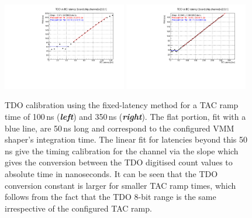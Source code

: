 \begin{figure}[!htb]
    \begin{center}
        \includegraphics[width=0.48\textwidth]{figures/nsw/calibration/timing_calib_bcLatency_TAC100}
        \includegraphics[width=0.48\textwidth]{figures/nsw/calibration/timing_calib_bcLatency_TAC350}
        \caption{
            TDO calibration using the fixed-latency method for a TAC ramp time of 100\,ns (\textbf{\textit{left}})
            and 350\,ns (\textbf{\textit{right}}).
            The flat portion, fit with a blue line, are 50\,ns long and correspond to the configured
            VMM shaper's integration time.
            The linear fit for latencies beyond this 50\,ns give the timing calibration for the channel via
            the slope which gives the conversion between the TDO digitised count values to absolute
            time in nanoseconds.
            It can be seen that the TDO conversion constant is larger for smaller TAC ramp times,
            which follows from the fact that the TDO 8-bit range is the same irrespective of the configured
            TAC ramp.
        }
        \label{fig:timing_calib_bcLatency}
    \end{center}
\end{figure}

